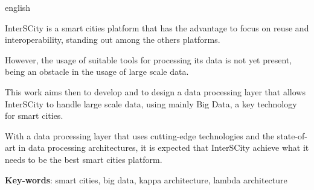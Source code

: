 \begin{resumo}[Abstract]
 \begin{otherlanguage*}{english}

     InterSCity is a smart cities platform that has the advantage to focus
     on reuse and interoperability, standing out among the others platforms.

     However, the usage of suitable tools for processing its data is not yet
     present, being an obstacle in the usage of large scale data.

     This work aims then to develop and to design a data processing layer that
     allows InterSCity to handle large scale data, using mainly Big Data, a key
     technology for smart cities.

     With a data processing layer that uses cutting-edge technologies and the
     state-of-art in data processing architectures, it is expected that InterSCity
     achieve what it needs to be the best smart cities platform.

   \vspace{\onelineskip}
 
   \noindent 
   \textbf{Key-words}: smart cities, big data, kappa architecture, lambda architecture
 \end{otherlanguage*}
\end{resumo}
